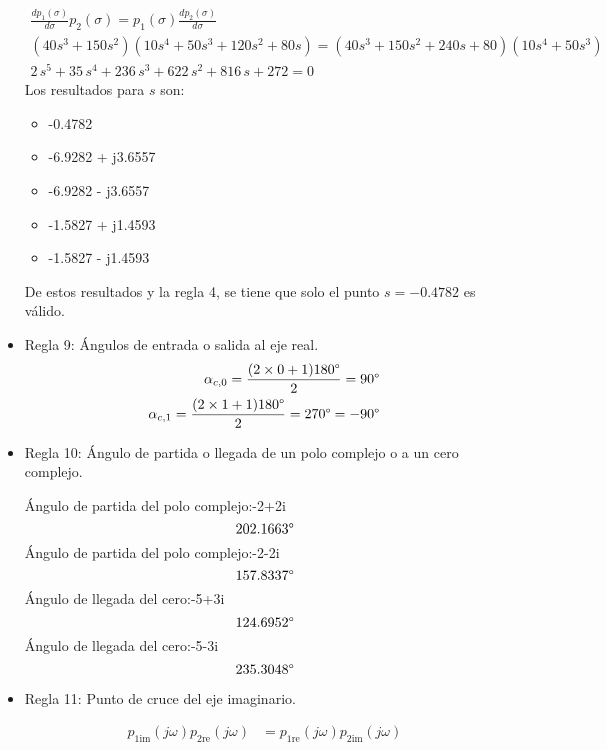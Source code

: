 \begin{itemize}
  \begin{align*}
    \frac{dp_1(\sigma)}{d\sigma} p_2(\sigma) = p_1(\sigma) \frac{dp_2(\sigma)}{d\sigma}
    \\
    (40s^3+150s^2)(10s^4+50s^3+120s^2+80s) = (40s^3+150s^2+240s+80)(10s^4+50s^3)
    \\
    2\,s^5+35\,s^4+236\,s^3+622\,s^2+816\,s+272 = 0
  \end{align*}
  Los resultados para $s$ son:
  \begin{itemize}
    \item -0.4782
    \item -6.9282 + j3.6557
    \item -6.9282 - j3.6557
    \item -1.5827 + j1.4593
    \item -1.5827 - j1.4593
  \end{itemize}
  De estos resultados y la regla 4, se tiene que solo el punto $s=-0.4782$ es válido.
  \item Regla 9: Ángulos de entrada o salida al eje real.
  \begin{align*}
    \alpha_{c,0} = \frac{(2\times0+1)180\degree}{2} = 90\degree
    \\
    \alpha_{c,1} = \frac{(2\times1+1)180\degree}{2} = 270\degree = -90\degree
  \end{align*}
  \item Regla 10: Ángulo de partida o llegada de un polo complejo o a un cero complejo.

  Ángulo de partida del polo complejo:-2+2i
  \begin{equation*}
  202.1663\degree
  \end{equation*}
  Ángulo de partida del polo complejo:-2-2i
  \begin{equation*}
  157.8337\degree
  \end{equation*}
  Ángulo de llegada del cero:-5+3i
  \begin{equation*}
  124.6952\degree
  \end{equation*}
  Ángulo de llegada del cero:-5-3i
  \begin{equation*}
  235.3048\degree
  \end{equation*}

  \item Regla 11: Punto de cruce del eje imaginario.

  \begin{align*}
    p_{1\text{im}}(j\omega) p_{2\text{re}}(j\omega) &=  p_{1\text{re}}(j\omega) p_{2\text{im}}(j\omega)
  \end{align*}


\end{itemize}
